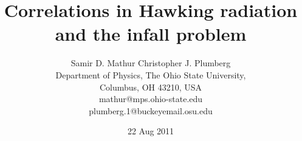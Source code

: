 \documentclass[12pt]{article}
\begin{document}




\makeatletter
{}
\makeatother



%
\title{Correlations in Hawking radiation and the infall problem}
\author{Samir D. Mathur\quad
Christopher J. Plumberg\\
\normalsize Department of Physics, The Ohio State University,\\ 
\normalsize Columbus, OH 43210, USA\\ 
\normalsize
mathur@mps.ohio-state.edu\\
\normalsize
plumberg.1@buckeyemail.osu.edu}
\date{\normalsize 22 Aug 2011}

\thispagestyle{empty}
\maketitle
\end{document}
